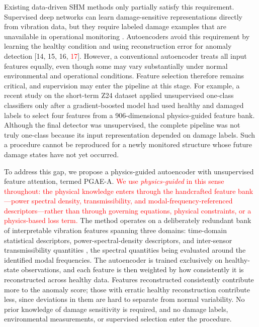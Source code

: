 \documentclass[11pt,a4paper]{article}
\begin{document}
Existing data-driven SHM methods only partially satisfy this requirement.
Supervised deep networks can learn damage-sensitive representations directly from
vibration data, but they require labeled damage examples that are unavailable in
operational monitoring \cite{abdeljaber2017}. Autoencoders avoid this requirement
by learning the healthy condition and using reconstruction error for anomaly
detection [14, 15, 16, \textcolor{red}{17}]. However, a conventional
autoencoder treats all input features equally, even though some may vary
substantially under normal environmental and operational conditions. Feature
selection therefore remains critical, and supervision may enter the pipeline at
this stage. For example, a recent study on the short-term Z24 dataset
\cite{abdrabo2024} applied unsupervised one-class classifiers only after a
gradient-boosted model had used healthy and damaged labels to select four
features from a 906-dimensional physics-guided feature bank. Although the final
detector was unsupervised, the complete pipeline was not truly one-class because
its input representation depended on damage labels. Such a procedure cannot be
reproduced for a newly monitored structure whose future damage states have not
yet occurred.

To address this gap, we propose a physics-guided autoencoder with unsupervised
feature attention, termed PGAE-A.
\textcolor{red}{We use \emph{physics-guided} in this sense throughout: the
physical knowledge enters through the handcrafted feature bank---power
spectral density, transmissibility, and modal-frequency-referenced
descriptors---rather than through governing equations, physical constraints,
or a physics-based loss term.}
The method operates on a deliberately redundant
bank of interpretable vibration features spanning three domains: time-domain
statistical descriptors, power-spectral-density descriptors, and inter-sensor
transmissibility quantities \cite{johnson2002}, the spectral quantities being
evaluated around the identified modal frequencies. The autoencoder is trained
exclusively on healthy-state observations, and each feature is then weighted by
how consistently it is reconstructed across healthy data. Features reconstructed
consistently contribute more to the anomaly score; those with erratic healthy
reconstruction contribute less, since deviations in them are hard to separate
from normal variability. No prior knowledge of damage sensitivity is required,
and no damage labels, environmental measurements, or supervised selection enter
the procedure.
\end{document}

